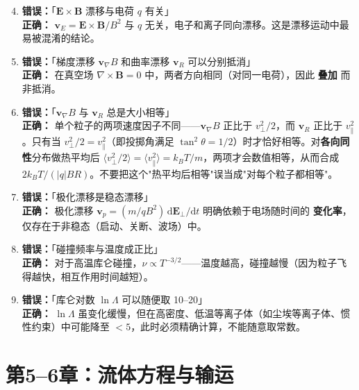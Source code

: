 \documentclass[12pt,a4paper,openany,oneside]{book}
\newcommand{\vect}[1]{\bm{#1}}
\newcommand{\curl}{\nabla\times}
\begin{document}
\begin{warning}{}{}
\begin{enumerate}
\setcounter{enumi}{3}
\item \textbf{错误：}「$\vect{E}\times\vect{B}$ 漂移与电荷 $q$ 有关」\\
\textbf{正确：} $\vect{v}_E = \vect{E}\times\vect{B}/B^2$ 与 $q$ 无关，电子和离子同向漂移。这是漂移运动中最易被混淆的结论。

\item \textbf{错误：}「梯度漂移 $\vect{v}_\nabla B$ 和曲率漂移 $\vect{v}_R$ 可以分别抵消」\\
\textbf{正确：} 在真空场 $\curl\vect{B}=0$ 中，两者方向相同（对同一电荷），因此 \textbf{叠加} 而非抵消。

\item \textbf{错误：}「$\vect{v}_\nabla B$ 与 $\vect{v}_R$ 总是大小相等」\\
\textbf{正确：} 单个粒子的两项速度因子不同——$\vect{v}_\nabla B$ 正比于 $v_\perp^2/2$，而 $\vect{v}_R$ 正比于 $v_\parallel^2$。只有当 $v_\perp^2/2=v_\parallel^2$（即投掷角满足 $\tan^2\theta=1/2$）时才恰好相等。对\textbf{各向同性}分布做热平均后 $\langle v_\perp^2/2\rangle=\langle v_\parallel^2\rangle=k_BT/m$，两项才会数值相等，从而合成 $2k_BT/(|q|BR)$。不要把这个"热平均后相等"误当成"对每个粒子都相等"。

\item \textbf{错误：}「极化漂移是稳态漂移」\\
\textbf{正确：} 极化漂移 $\vect{v}_p = (m/qB^2)\,\mathrm{d}\vect{E}_\perp/\mathrm{d}t$ 明确依赖于电场随时间的 \textbf{变化率}，仅存在于非稳态（启动、关断、波场）中。

\item \textbf{错误：}「碰撞频率与温度成正比」\\
\textbf{正确：} 对于高温库仑碰撞，$\nu\propto T^{-3/2}$——温度越高，碰撞越慢（因为粒子飞得越快，相互作用时间越短）。

\item \textbf{错误：}「库仑对数 $\ln\Lambda$ 可以随便取 10--20」\\
\textbf{正确：} $\ln\Lambda$ 虽变化缓慢，但在高密度、低温等离子体（如尘埃等离子体、惯性约束）中可能降至 $<5$，此时必须精确计算，不能随意取常数。
\end{enumerate}
\end{warning}


\section{第5--6章：流体方程与输运}
\end{document}
